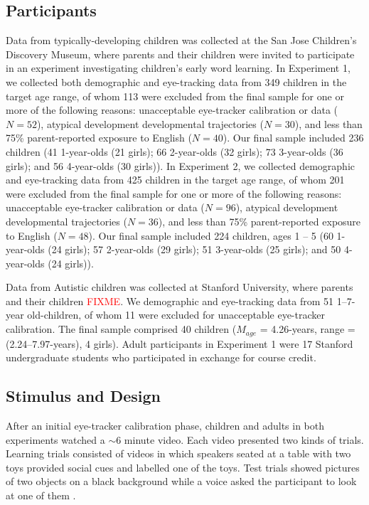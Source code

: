 \documentclass{pnastwo}
\newcommand{\red}[1]{\textcolor{red}{#1}}
\begin{document}
\begin{article}
\begin{materials}

\subsection{Participants} Data from typically-developing children was collected at the San Jose Children's Discovery Museum, where parents and their children were invited to participate in an experiment investigating children's early word learning. In Experiment 1, we collected both demographic and eye-tracking data from 349 children in the target age range, of whom 113 were excluded from the final sample for one or more of the following reasons: unacceptable eye-tracker calibration or data ($N=52$), atypical development developmental trajectories ($N=30$), and less than 75\% parent-reported exposure to English ($N=40$). Our final sample included 236 children (41 1-year-olds (21 girls); 66 2-year-olds (32 girls); 73 3-year-olds (36 girls); and 56 4-year-olds (30 girls)). In Experiment 2, we collected demographic and eye-tracking data from 425 children in the target age range, of whom 201 were excluded from the final sample for one or more of the following reasons: unacceptable eye-tracker calibration or data ($N=96$), atypical development developmental trajectories ($N=36$), and less than 75\% parent-reported exposure to English ($N=48$). Our final sample included 224 children, ages 1 -- 5 (60 1-year-olds (24 girls); 57 2-year-olds (29 girls); 51 3-year-olds (25 girls); and 50 4-year-olds (24 girls)).

Data from Autistic children was collected at Stanford University, where parents and their children \red{FIXME}. We demographic and eye-tracking data from 51 1--7-year old-children, of whom 11 were excluded for unacceptable eye-tracker calibration. The final sample comprised 40 children ($M_{age}$ = 4.26-years, range = (2.24--7.97-years), 4 girls). Adult participants in Experiment 1 were 17 Stanford undergraduate students who participated in exchange for course credit.

\subsection{Stimulus and Design} After an initial eye-tracker calibration phase, children and adults in both experiments watched a $\sim$6 minute video. Each video presented two kinds of trials. Learning trials consisted of videos in which speakers seated at a table with two toys provided social cues and labelled one of the toys. Test trials showed pictures of two objects on a black background while a voice asked the participant to look at one of them \cite[as in][]{fernald1998}. 


\end{materials}
\end{article}
\end{document}
